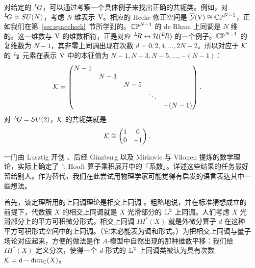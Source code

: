 对给定的 $^L\negthinspace G$，可以通过考察一个具体例子来找出正确的共轭类。例如，对 $^L\negthinspace G=SU(N)$，考虑 $N$ 维表示 $\VV$。相应的 Hecke 修正空间是 $\bar {{\EUY}}(\VV)\cong \Bbb{CP}^{N-1}$，正如我们在第~\ref{sec:spaceheck}~节所学到的。$\Bbb{CP}^{N-1}$ 的 de Rham 上同调是 $N$ 维的。这一维数与 $\VV$ 的维数相符，正是对应 $^L\negthinspace R\leftrightarrow {\cal H}({}^L\negthinspace R)$ 的一个例子。$\Bbb{CP}^{N-1}$ 的复维数为 $N-1$，其非零上同调出现在次数 $d=0,2,4,\dots,2N-2$。所以对应于 ${\EUK}$ 的 $^L\negthinspace \frak{g}$ 元素在表示 $\VV$ 中的本征值为 $N-1,N-3,N-5,\dots,-(N-1)$： %
\setcounter{equation}{28}
\begin{equation}\label{eq:unosn}
\EUK=\left(\begin{matrix}N-1& &&& \\ & N-3 &&&\\ &&
N-5 &&\\ &&&\ddots & \\ &&&& -(N-1)\\\end{matrix}\right).
\end{equation}
 对 $^L\negthinspace G=SU(2)$，${\EUK}$ 的共轭类就是 %
\setcounter{equation}{29}
\begin{equation}\label{eq:mitlgo}
{\EUK}\cong\left(\begin{matrix}1 & 0 \\ 0 & -1
\\\end{matrix}\right).
\end{equation}

\par{}

一门由 Lusztig 开创 \cite{ref98}、后经 Ginzburg \cite{ref96} 以及 Mirkovic 与 Vilonen \cite{ref97} 提炼的数学理论，实际上确定了 't Hooft 算子乘积展开中的「系数」。详述这些结果的任务最好留给别人。作为替代，我们在此尝试用物理学家可能觉得有启发的语言表达其中一些想法。


首先，该定理所用的上同调理论是相交上同调 \cite{ref128,ref129}。粗略地说，并在标准猜想成立的前提下，代数簇 $X$ 的相交上同调就是 $X$ 光滑部分的 ${\Bbb{L}}^2$ 上同调。人们考虑 $X$ 光滑部分上的平方可积微分形式。相交上同调 $IH^*(X)$ 就是外微分算子 $d$ 在这种平方可积形式空间中的上同调。（它未必能表为调和形式。）为把相交上同调与量子场论对应起来，方便的做法是作 $A$-模型中自然出现的那种维数平移：我们给 $IH^*(X)$ 定义分次，使得一个 $d$-形式的 ${\Bbb{L}}^2$ 上同调类被认为具有次数 $\EUK=d-{\rm dim}_{{\Bbb C}}(X)$。

